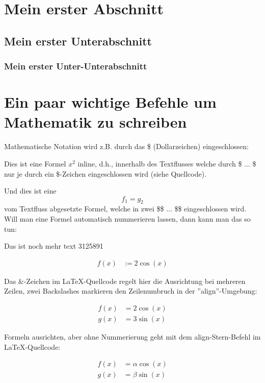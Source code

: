 \newpage %
\section{Mein erster Abschnitt}

\subsection{Mein erster Unterabschnitt}

\subsubsection{Mein erster Unter-Unterabschnitt}


\section{Ein paar wichtige Befehle um Mathematik zu schreiben}

Mathematische Notation wird z.B. durch das \$ (Dollarzeichen) eingeschlossen: 

Dies ist eine Formel $x^2$ inline, d.h., innerhalb des Textflusses welche durch \$ ... \$ nur je durch ein \$-Zeichen eingeschlossen wird (siehe Quellcode).

Und dies ist eine $$f_1 = g_2$$ vom Textfluss abgesetzte Formel, welche in zwei \$\$ ... \$\$ eingeschlossen wird. Will man eine Formel automatisch nummerieren lassen, dann kann man das so tun:

Das ist noch mehr text 3125891

\begin{align}
	f(x) &:= 2 \cos(x) 
\end{align}

Das \&-Zeichen im LaTeX-Quellcode regelt hier die Ausrichtung bei mehreren Zeilen, zwei Backslashes markieren den Zeilenumbruch in der ''align''-Umgebung:

\begin{align}
	f(x) &= 2 \cos(x) \\
	g(x) &= 3 \sin(x)
\end{align}		

Formeln ausrichten, aber ohne Nummerierung geht mit dem align-Stern-Befehl im LaTeX-Quellcode:

\begin{align*}
	f(x) &= \alpha \cos(x) \\
	g(x) &= \beta \sin(x)
\end{align*}		

